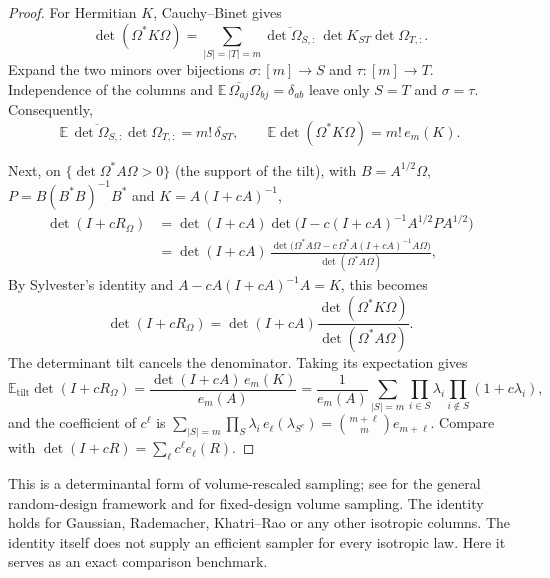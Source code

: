 \documentclass[11pt,a4paper]{article}
\theoremstyle{definition}
\newcommand{\E}{\mathbb{E}}
\newcommand{\tilt}{\mathrm{tilt}}
\begin{document}
\begin{proof}
For Hermitian $K$, Cauchy--Binet gives
\[
\det(\Omega^*K\Omega)=\sum_{|S|=|T|=m}
 \overline{\det\Omega_{S,:}}\,\det K_{ST}\det\Omega_{T,:}.
\]
Expand the two minors over bijections $\sigma:[m]\to S$ and $\tau:[m]\to T$. Independence of the columns and $\E\,\overline{\Omega_{aj}}\Omega_{bj}=\delta_{ab}$ leave only $S=T$ and $\sigma=\tau$. Consequently,
\[
\E\,\overline{\det\Omega_{S,:}}\det\Omega_{T,:}=m!\,\delta_{ST},
\qquad \E\det(\Omega^*K\Omega)=m!\,e_m(K).
\]

Next, on $\{\det\Omega^*A\Omega>0\}$ (the support of the tilt), with $B=A^{1/2}\Omega$, $P=B(B^*B)^{-1}B^*$ and $K=A(I+cA)^{-1}$,
\begin{align*}
\det(I+cR_\Omega)&=\det(I+cA)\det\big(I-c(I+cA)^{-1}A^{1/2}PA^{1/2}\big)\\
&=\det(I+cA)\,\frac{\det\big(\Omega^*A\Omega-c\,\Omega^*A(I+cA)^{-1}A\Omega\big)}{\det(\Omega^*A\Omega)},
\end{align*}
By Sylvester's identity and $A-cA(I+cA)^{-1}A=K$, this becomes
\[
\det(I+cR_\Omega)
=\det(I+cA)\frac{\det(\Omega^*K\Omega)}{\det(\Omega^*A\Omega)}.
\]
The determinant tilt cancels the denominator. Taking its expectation gives
\[
\E_\tilt\det(I+cR_\Omega)=\frac{\det(I+cA)\,e_m(K)}{e_m(A)}=\frac1{e_m(A)}\sum_{|S|=m}\prod_{i\in S}\lambda_i\prod_{i\notin S}(1+c\lambda_i),
\]
and the coefficient of $c^\ell$ is $\sum_{|S|=m}\prod_S\lambda_i\,e_\ell(\lambda_{S^c})=\binom{m+\ell}{m}e_{m+\ell}$. Compare with $\det(I+cR)=\sum_\ell c^\ell e_\ell(R)$.
\end{proof}

This is a determinantal form of volume-rescaled sampling; see \cite{DWH} for the general random-design framework and \cite{DW} for fixed-design volume sampling. The identity holds for Gaussian, Rademacher, Khatri--Rao or any other isotropic columns. The identity itself does not supply an efficient sampler for every isotropic law. Here it serves as an exact comparison benchmark.
\end{document}
